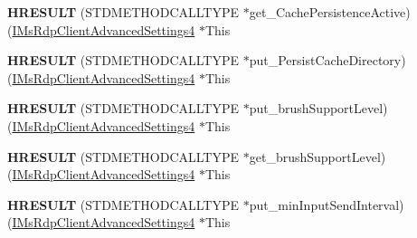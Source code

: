 \begin{DoxyCompactItemize}
\item 
\mbox{\label{struct_m_s_t_s_c_lib_1_1_i_ms_rdp_client_advanced_settings4_vtbl_ad9914e80dc5ad0a9974f7cde54840f96}} 
{\bfseries H\+R\+E\+S\+U\+LT} (S\+T\+D\+M\+E\+T\+H\+O\+D\+C\+A\+L\+L\+T\+Y\+PE $\ast$get\+\_\+\+Cache\+Persistence\+Active)(\hyperlink{interface_m_s_t_s_c_lib_1_1_i_ms_rdp_client_advanced_settings4}{I\+Ms\+Rdp\+Client\+Advanced\+Settings4} $\ast$This
\item 
\mbox{\label{struct_m_s_t_s_c_lib_1_1_i_ms_rdp_client_advanced_settings4_vtbl_a02befeecf3b1e367d902d8f7356ec4b0}} 
{\bfseries H\+R\+E\+S\+U\+LT} (S\+T\+D\+M\+E\+T\+H\+O\+D\+C\+A\+L\+L\+T\+Y\+PE $\ast$put\+\_\+\+Persist\+Cache\+Directory)(\hyperlink{interface_m_s_t_s_c_lib_1_1_i_ms_rdp_client_advanced_settings4}{I\+Ms\+Rdp\+Client\+Advanced\+Settings4} $\ast$This
\item 
\mbox{\label{struct_m_s_t_s_c_lib_1_1_i_ms_rdp_client_advanced_settings4_vtbl_a4b6e1074f4085bb7194c8c0852cb36dd}} 
{\bfseries H\+R\+E\+S\+U\+LT} (S\+T\+D\+M\+E\+T\+H\+O\+D\+C\+A\+L\+L\+T\+Y\+PE $\ast$put\+\_\+brush\+Support\+Level)(\hyperlink{interface_m_s_t_s_c_lib_1_1_i_ms_rdp_client_advanced_settings4}{I\+Ms\+Rdp\+Client\+Advanced\+Settings4} $\ast$This
\item 
\mbox{\label{struct_m_s_t_s_c_lib_1_1_i_ms_rdp_client_advanced_settings4_vtbl_a5507b62108e84c18dc6bcb6681a86edf}} 
{\bfseries H\+R\+E\+S\+U\+LT} (S\+T\+D\+M\+E\+T\+H\+O\+D\+C\+A\+L\+L\+T\+Y\+PE $\ast$get\+\_\+brush\+Support\+Level)(\hyperlink{interface_m_s_t_s_c_lib_1_1_i_ms_rdp_client_advanced_settings4}{I\+Ms\+Rdp\+Client\+Advanced\+Settings4} $\ast$This
\item 
\mbox{\label{struct_m_s_t_s_c_lib_1_1_i_ms_rdp_client_advanced_settings4_vtbl_ab74a84ee7c8dc96037010d0eda0bb299}} 
{\bfseries H\+R\+E\+S\+U\+LT} (S\+T\+D\+M\+E\+T\+H\+O\+D\+C\+A\+L\+L\+T\+Y\+PE $\ast$put\+\_\+min\+Input\+Send\+Interval)(\hyperlink{interface_m_s_t_s_c_lib_1_1_i_ms_rdp_client_advanced_settings4}{I\+Ms\+Rdp\+Client\+Advanced\+Settings4} $\ast$This

\end{DoxyCompactItemize}
